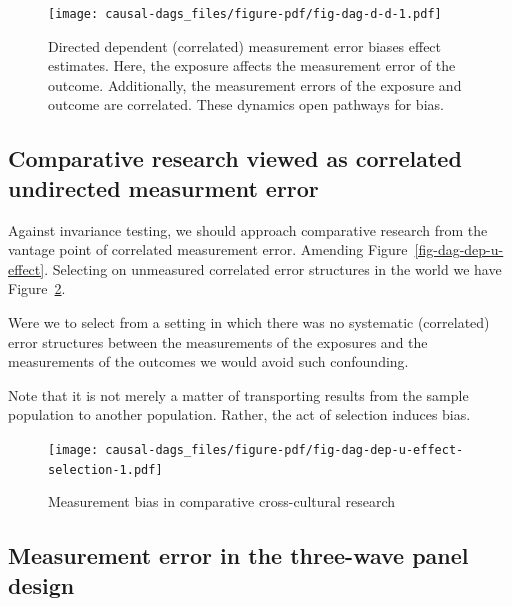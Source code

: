 \documentclass[
  singlecolumn]{report}
\begin{document}
\begin{figure}

{\centering \texttt{[image: causal-dags\_files/figure-pdf/fig-dag-d-d-1.pdf]}

}

\caption{\label{fig-dag-d-d}Directed dependent (correlated) measurement
error biases effect estimates. Here, the exposure affects the
measurement error of the outcome. Additionally, the measurement errors
of the exposure and outcome are correlated. These dynamics open pathways
for bias.}

\end{figure}

\hypertarget{comparative-research-viewed-as-correlated-undirected-measurment-error}{%
\subsection{Comparative research viewed as correlated undirected
measurment
error}\label{comparative-research-viewed-as-correlated-undirected-measurment-error}}

Against invariance testing, we should approach comparative research from
the vantage point of correlated measurement error. Amending
Figure~\ref{fig-dag-dep-u-effect}. Selecting on unmeasured correlated
error structures in the world we have
Figure~\ref{fig-dag-dep-u-effect-selection}.

Were we to select from a setting in which there was no systematic
(correlated) error structures between the measurements of the exposures
and the measurements of the outcomes we would avoid such confounding.

Note that it is not merely a matter of transporting results from the
sample population to another population. Rather, the act of selection
induces bias.

\begin{figure}

{\centering \texttt{[image: causal-dags\_files/figure-pdf/fig-dag-dep-u-effect-selection-1.pdf]}

}

\caption{\label{fig-dag-dep-u-effect-selection}Measurement bias in
comparative cross-cultural research}

\end{figure}

\hypertarget{measurement-error-in-the-three-wave-panel-design}{%
\subsection{Measurement error in the three-wave panel
design}\label{measurement-error-in-the-three-wave-panel-design}}
\end{document}
